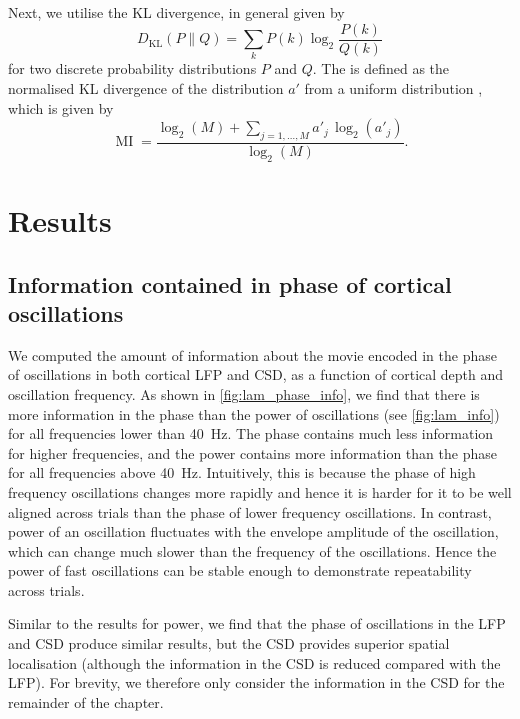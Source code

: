 Next, we utilise the \ac{KL} divergence, in general given by
\begin{equation}
D_\text{KL}(P \| Q) = \sum_k P(k) \log_2 \frac{P(k)}{Q(k)}
\end{equation}
for two discrete probability distributions $P$ and $Q$.
The  is defined as the normalised \ac{KL} divergence of the distribution $a'$ from a uniform distribution \citep{Tort2010}, which is given by
\begin{equation}
\operatorname{MI} = \frac{
\log_2(M) + \sum_{j = 1,\ldots,M} a'_j \, \log_2(a'_j)
}{
\log_2(M)
}
.\end{equation}


\section{Results}


\subsection{Information contained in phase of cortical oscillations}

We computed the amount of information about the movie encoded in the phase of oscillations in both cortical \ac{LFP} and \ac{CSD}, as a function of cortical depth and oscillation frequency.
As shown in \autoref{fig:lam_phase_info}, we find that there is more information in the phase than the power of oscillations (see \autoref{fig:lam_info}) for all frequencies lower than \SI{40}{Hz}.
The phase contains much less information for higher frequencies, and the power contains more information than the phase for all frequencies above \SI{40}{Hz}.
Intuitively, this is because the phase of high frequency oscillations changes more rapidly and hence it is harder for it to be well aligned across trials than the phase of lower frequency oscillations.
In contrast, power of an oscillation fluctuates with the envelope amplitude of the oscillation, which can change much slower than the frequency of the oscillations.
Hence the power of fast oscillations can be stable enough to demonstrate repeatability across trials.

Similar to the results for power, we find that the phase of oscillations in the \ac{LFP} and \ac{CSD} produce similar results, but the \ac{CSD} provides superior spatial localisation (although the information in the \ac{CSD} is reduced compared with the \ac{LFP}).
For brevity, we therefore only consider the information in the \ac{CSD} for the remainder of the chapter.

